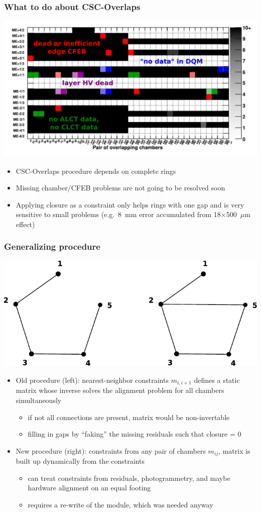 \documentclass[compress]{beamer}
\begin{document}
\begin{frame}
\frametitle{What to do about CSC-Overlaps}

\includegraphics[width=0.9\linewidth]{occupancy_problems.pdf}

\begin{itemize}
\item CSC-Overlaps procedure depends on complete rings
\item Missing chamber/CFEB problems are not going to be resolved soon
\item Applying closure as a constraint only helps rings with one gap
  and is very sensitive to small problems (e.g.\ 8~mm error
  accumulated from 18$\times$500~$\mu$m effect)
\end{itemize}
\end{frame}

\begin{frame}
\frametitle{Generalizing procedure}

\includegraphics[width=0.5\linewidth]{incomplete_and_crosswise.pdf}

\begin{itemize}
\item Old procedure (left): nearest-neighbor constraints $m_{i,i+1}$ defines
  a static matrix whose inverse solves the alignment problem for all
  chambers simultaneously
\begin{itemize}
\item if not all connections are present, matrix would be non-invertable
\item filling in gaps by ``faking'' the missing residuals such that closure = 0
\end{itemize}

\item New procedure (right): constraints from any pair of chambers
  $m_{ij}$, matrix is built up dynamically from the constraints
\begin{itemize}
\item can treat constraints from residuals, photogrammetry, and maybe
  hardware alignment on an equal footing
\item requires a re-write of the module, which was needed anyway
\end{itemize}
\end{itemize}
\end{frame}           
\end{document}
